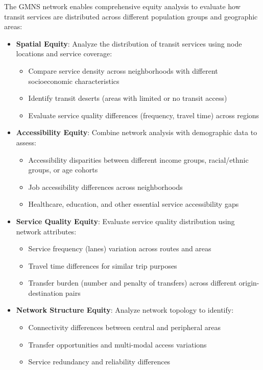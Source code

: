 \documentclass[11pt,a4paper]{article}
\begin{document}
The GMNS network enables comprehensive equity analysis to evaluate how transit services are distributed across different population groups and geographic areas:

\begin{itemize}
    \item \textbf{Spatial Equity}: Analyze the distribution of transit services using node locations and service coverage:
    \begin{itemize}
        \item Compare service density across neighborhoods with different socioeconomic characteristics
        \item Identify transit deserts (areas with limited or no transit access)
        \item Evaluate service quality differences (frequency, travel time) across regions
    \end{itemize}
    \item \textbf{Accessibility Equity}: Combine network analysis with demographic data to assess:
    \begin{itemize}
        \item Accessibility disparities between different income groups, racial/ethnic groups, or age cohorts
        \item Job accessibility differences across neighborhoods
        \item Healthcare, education, and other essential service accessibility gaps
    \end{itemize}
    \item \textbf{Service Quality Equity}: Evaluate service quality distribution using network attributes:
    \begin{itemize}
        \item Service frequency (lanes) variation across routes and areas
        \item Travel time differences for similar trip purposes
        \item Transfer burden (number and penalty of transfers) across different origin-destination pairs
    \end{itemize}
    \item \textbf{Network Structure Equity}: Analyze network topology to identify:
    \begin{itemize}
        \item Connectivity differences between central and peripheral areas
        \item Transfer opportunities and multi-modal access variations
        \item Service redundancy and reliability differences
    \end{itemize}
\end{itemize}
\end{document}
